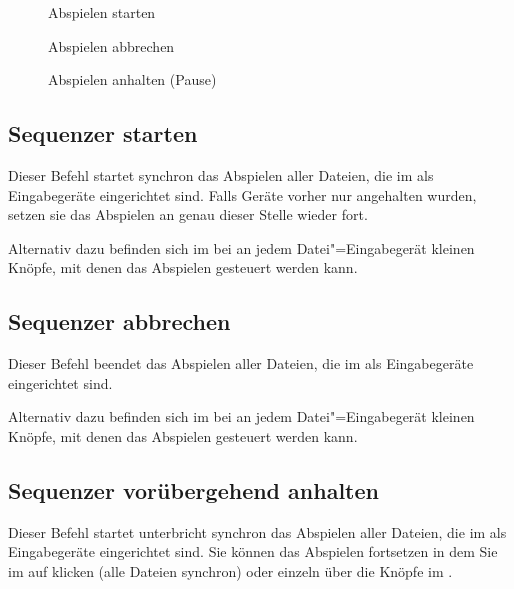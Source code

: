 \begin{description}
\item[] Abspielen starten
\item[] Abspielen abbrechen
\item[] Abspielen anhalten (Pause)
\end{description}

\subsection{Sequenzer starten}
\label{sec:MI_INDEVPLAY}


Dieser Befehl startet synchron das Abspielen aller Dateien, die im
 als Eingabegeräte
eingerichtet sind. Falls Geräte vorher nur angehalten wurden, setzen
sie das Abspielen an genau dieser Stelle wieder fort.


Alternativ dazu befinden sich im
 bei
 an jedem
Datei"=Eingabegerät kleinen Knöpfe, mit denen das Abspielen gesteuert
werden kann.



\subsection{Sequenzer abbrechen}\label{sec:MI_INDEVSTOP}


Dieser Befehl beendet das Abspielen aller Dateien, die im
 als Eingabegeräte
eingerichtet sind.


Alternativ dazu befinden sich im
 bei
 an jedem
Datei"=Eingabegerät kleinen Knöpfe, mit denen das Abspielen gesteuert
werden kann.


\subsection{Sequenzer vorübergehend anhalten}
\label{sec:MI_INDEVPAUSE}

Dieser Befehl startet unterbricht synchron das Abspielen aller
Dateien, die im  als
Eingabegeräte eingerichtet sind. Sie können das Abspielen fortsetzen
in dem Sie im 
 auf
 klicken (alle Dateien synchron) oder
einzeln über die Knöpfe im .


